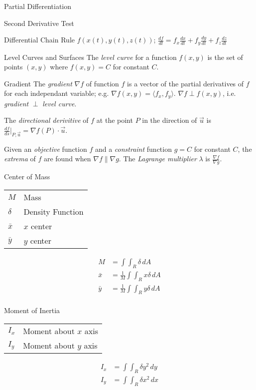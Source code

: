 \begin{section}{Partial Differentiation}
\begin{section}{Second Derivative Test}
  \end{section}
  \begin{section}{Differential Chain Rule}
    $f(x(t),y(t),z(t))$;
    $\frac{df}{dt}=
    f_{x}\frac{dx}{dt} + f_{y}\frac{dy}{dt} + f_{z}\frac{dz}{dt}$
  \end{section}

  \begin{section}{Level Curves and Surfaces}
    The \emph{level curve} for a function $f(x,y)$ is the set of
    points $(x,y)$ where $f(x,y)=C$ for constant $C$.
  \end{section}

  \begin{section}{Gradient}
    The \emph{gradient} $\nabla{f}$ of function $f$ is a vector of the
    partial derivatives of $f$ for each independant variable; e.g.
    $\nabla f(x,y) = \langle f_x,f_y \rangle $.
    $\nabla{f} \perp f(x,y)$, i.e.  \emph{gradient} $\perp$
    \emph{level curve}.

    The \emph{directional derivitive} of $f$ at the point $P$ in the
    direction of $\vec{u}$ is
    $\frac{df}{ds}\biggr\rvert_{P,\vec{u}}=\nabla{f}(P)\cdot\vec{u}$.

    Given an \emph{objective} function $f$ and a \emph{constraint}
    function $g=C$ for constant $C$, the \emph{extrema} of $f$
    are found when $\nabla{f} \parallel \nabla{g}$. The
    \emph{Lagrange multiplier} $\lambda$ is
    $\frac{\nabla{f}}{\nabla{g}}$.
  \end{section}
  \begin{section}{Center of Mass}
    \begin{tabular}{l l}
      $M$ & Mass\\
      $\delta$ & Density Function\\
      $\bar{x}$ & $x$ center\\
      $\bar{y}$ & $y$ center\\
    \end{tabular}
    \begin{align*}
      M&=\int\int_R{\delta} \,dA\\
      \bar{x}&=\frac{1}{M}\int\int_R{x\delta} \,dA\\
      \bar{y}&=\frac{1}{M}\int\int_R{y\delta} \,dA\\
    \end{align*}
  \end{section}

  \begin{section}{Moment of Inertia}
    \begin{tabular}{l l}
      $I_x$ & Moment about $x$ axis \\
      $I_y$ & Moment about $y$ axis \\
    \end{tabular}
    \begin{align*}
      I_x&=\int\int_R{\delta}y^2 \,dy\\
      I_y&=\int\int_R{\delta}x^2 \,dx\\
    \end{align*}
  \end{section}


\end{section}
